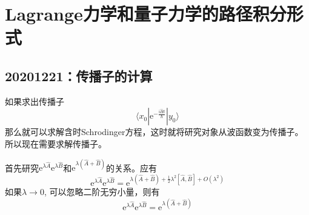 \chapter{Lagrange力学和量子力学的路径积分形式}
    \section{20201221：传播子的计算}

        如果求出传播子
        \begin{equation*}
            \langle x_0 | \mathrm{e}^{-\frac {\mathrm{i}\hat{H}t}{\hbar}} | y_0 \rangle
        \end{equation*}
        那么就可以求解含时Schrodinger方程，这时就将研究对象从波函数变为传播子。所以现在需要求解传播子。

        首先研究$\mathrm{e}^{\lambda \hat{A}}\mathrm{e}^{\lambda \hat{B}}$和$\mathrm{e}^{\lambda (\hat{A}+\hat{B})}$的关系。应有
        \begin{equation*}
            \mathrm{e}^{\lambda \hat{A}} \mathrm{e}^{\lambda \hat{B}} = \mathrm{e}^{\lambda (\hat{A}+\hat{B}) + \frac 12 \lambda^2 [\hat{A},\hat{B}] + O(\lambda^2)}
        \end{equation*}
        如果$\lambda \to 0$, 可以忽略二阶无穷小量，则有
        \begin{equation*}
            \mathrm{e}^{\lambda \hat{A}} \mathrm{e}^{\lambda \hat{B}} = \mathrm{e}^{\lambda (\hat{A}+\hat{B})}
        \end{equation*}

